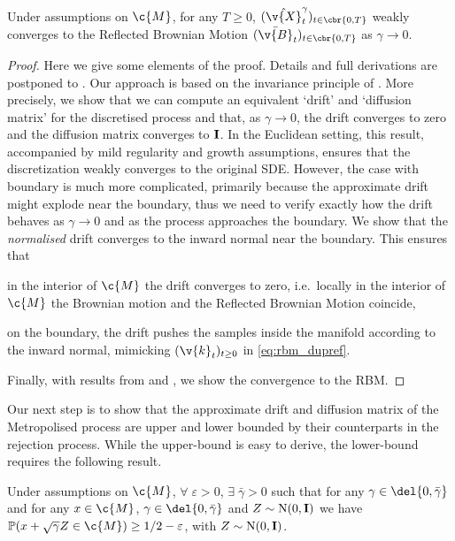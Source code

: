 \begin{theorem}
	\label{thm:weak_convergence_rejection}
	Under assumptions on $\c{M}$, for any $T \geq 0$, $(\hat{\v{X}}_t^\gamma)_{t \in \cbr{0,T}}$ weakly converges to the Reflected Brownian Motion $(\bar{\v{B}}_t)_{t \in \cbr{0,T}}$ as $\gamma \to 0$.

\end{theorem}

\begin{proof}
	Here we give some elements of the proof.
	Details and full derivations are postponed to .
	Our approach is based on the invariance principle of \cite{stroock1971diffusion}.
	More precisely, we show that we can compute an equivalent `drift' and `diffusion matrix' for the discretised process and that, as $\gamma \to 0$, the drift converges to zero and the diffusion matrix converges to $\m{I}$.
	In the Euclidean setting, this result, accompanied by mild regularity and growth assumptions, ensures that the discretization weakly converges to the original SDE.
	However, the case with boundary is much more complicated, primarily because the approximate drift might explode near the boundary, thus we need to verify exactly how the drift behaves as $\gamma \to 0$ and as the process approaches the boundary.
	We show that the \emph{normalised} drift converges to the inward normal near the boundary.
	This ensures that \begin{enumerate*}[label=(\alph*)] \item in the interior of $\c{M}$ the drift converges to zero, i.e.~locally in the interior of $\c{M}$ the Brownian motion and the Reflected Brownian Motion coincide, \item on the boundary, the drift pushes the samples inside the manifold according to the inward normal, mimicking $(\v{k}_t)_{t \geq 0}$ in \eqref{eq:rbm_dupref}.
	\end{enumerate*}
	Finally, with results from \cite{stroock1971diffusion} and \cite{kang2017submartingale}, we show the convergence to the RBM.

\end{proof}

Our next step is to show that the approximate drift and diffusion matrix of the Metropolised process are upper and lower bounded by their counterparts in the rejection process.
While the upper-bound is easy to derive, the lower-bound requires the following result.

\begin{proposition}
	\label{lemma:lower_bound_prob_main}
	Under assumptions on $\c{M}$, $\forall \; \varepsilon > 0$, $\exists \; \bar{\gamma} >0$ such that for any $\gamma \in \del{0, \bar{\gamma}}$ and for any $x \in \c{M}$, $\gamma \in \del{0, \bar{\gamma}}$ and $Z \sim \mathrm{N}(0, \m{I})$ we have $\mathbb{P}(x + \sqrt{\gamma} Z \in \c{M}) \geq 1/2-\varepsilon$, with $Z \sim \mathrm{N}(0, \m{I})$.
\end{proposition}

